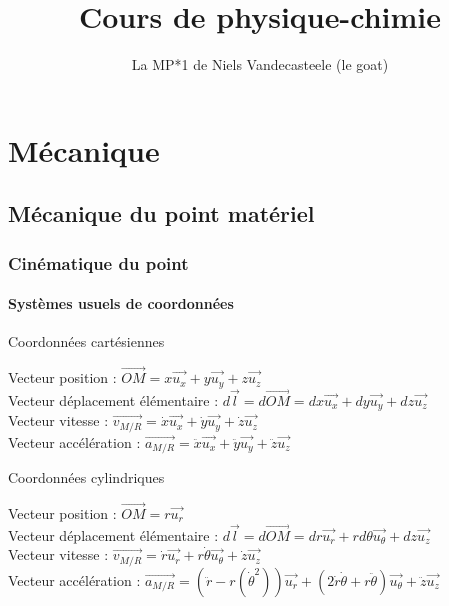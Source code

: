 \documentclass[french]{book}
\author{La MP*1 de Niels Vandecasteele (le goat)}
\title{Cours de physique-chimie}
\theoremstyle{plain}
\theoremstyle{definition}
\theoremstyle{remark}
\begin{document}
\maketitle

\tableofcontents

\setcounter{tocdepth}{3}

\part{Mécanique}
\chapter{Mécanique du point matériel}
\localtableofcontents
\section{Cinématique du point}
\subsection{Systèmes usuels de coordonnées}
\subparagraph{Coordonnées cartésiennes}
Vecteur position : $\overrightarrow{OM}=x\overrightarrow{u_x}+y\overrightarrow{u_y}+z\overrightarrow{u_z}$ \\
Vecteur déplacement élémentaire : $d\overrightarrow{l}=d\overrightarrow{OM}=dx\overrightarrow{u_x}+dy\overrightarrow{u_y}+dz\overrightarrow{u_z}$ \\
Vecteur vitesse : $\overrightarrow{v_{M/R}}=\dot{x}\overrightarrow{u_x}+\dot{y}\overrightarrow{u_y}+\dot{z}\overrightarrow{u_z}$ \\
Vecteur accélération : $\overrightarrow{a_{M/R}}=\ddot{x}\overrightarrow{u_x}+\ddot{y}\overrightarrow{u_y}+\ddot{z}\overrightarrow{u_z}$ \\

\subparagraph{Coordonnées cylindriques}
Vecteur position : $\overrightarrow{OM}=r\overrightarrow{u_r}$ \\
Vecteur déplacement élémentaire : $d\overrightarrow{l}=d\overrightarrow{OM}=dr\overrightarrow{u_r}+rd\theta\overrightarrow{u_\theta}+dz\overrightarrow{u_z}$ \\
Vecteur vitesse : $\overrightarrow{v_{M/R}}=\dot{r}\overrightarrow{u_r}+r\dot{\theta}\overrightarrow{u_\theta}+\dot{z}\overrightarrow{u_z}$ \\
Vecteur accélération : $\overrightarrow{a_{M/R}}=(\ddot{r}-r(\dot{\theta}^2))\overrightarrow{u_r}+(2\dot{r}\dot{\theta}+r\ddot{\theta})\overrightarrow{u_\theta}+\ddot{z}\overrightarrow{u_z}$ \\
\end{document}
